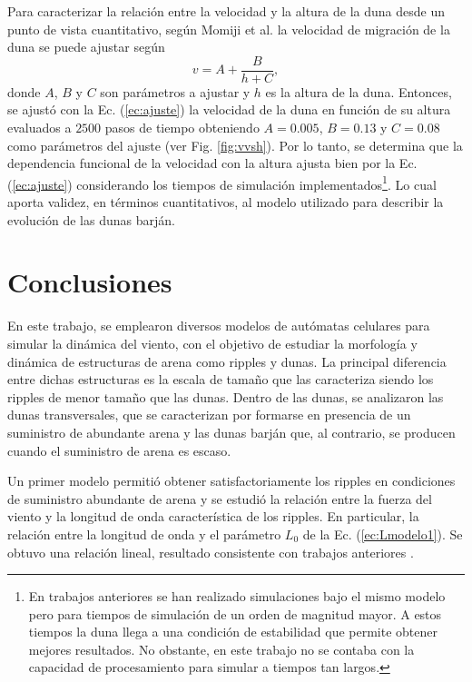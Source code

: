 \documentclass[11pt,twocolumn,twoside]{opticajnl}
\begin{document}
Para caracterizar la relación entre la velocidad y la altura de la duna desde un punto de vista cuantitativo, según Momiji et al. \cite{momiji_shape_2002} la velocidad de migración de la duna se puede ajustar según 
\begin{equation}
    v = A + \frac{B}{h+C},
    \label{ec:ajuste}
\end{equation} 
donde $A$, $B$ y $C$ son parámetros a ajustar y $h$ es la altura de la duna. Entonces, se ajustó con la Ec. (\ref{ec:ajuste}) la velocidad de la duna en función de su altura evaluados a $2500$ pasos de tiempo obteniendo $A=0.005$, $B=0.13$ y $C= 0.08$ como parámetros del ajuste (ver Fig. \ref{fig:vvsh}). Por lo tanto, se determina que la dependencia funcional de la velocidad con la altura ajusta bien por la Ec. (\ref{ec:ajuste}) considerando los tiempos de simulación implementados\footnote{En trabajos anteriores \cite{katsuki_cellular_2011} se han realizado simulaciones bajo el mismo modelo pero para tiempos de simulación de un orden de magnitud mayor. A estos tiempos la duna llega a una condición de estabilidad que permite obtener mejores resultados. No obstante, en este trabajo no se contaba con la capacidad de procesamiento para simular a tiempos tan largos.}. Lo cual aporta validez, en términos cuantitativos, al modelo utilizado para describir la evolución de las dunas barján. 


\section{Conclusiones}
\vspace{0.42cm}
En este trabajo, se emplearon diversos modelos de autómatas celulares para simular la dinámica del viento, con el objetivo de estudiar la morfología y dinámica de estructuras de arena como ripples y dunas. La principal diferencia entre dichas estructuras es la escala de tamaño que las caracteriza siendo los ripples de menor tamaño que las dunas. Dentro de las dunas, se analizaron las dunas transversales, que se caracterizan por formarse en presencia de un suministro de abundante arena y las dunas barján que, al contrario, se producen cuando el suministro de arena es escaso.

Un primer modelo \cite{katsuki_cellular_2011} permitió obtener satisfactoriamente los ripples en condiciones de suministro abundante de arena y se estudió la relación entre la fuerza del viento y la longitud de onda característica de los ripples. En particular, la relación entre la longitud de onda y el parámetro $L_0$ de la Ec. (\ref{ec:Lmodelo1}). Se obtuvo una relación lineal, resultado consistente con trabajos anteriores \cite{nishimori_formation_1993}.
\end{document}
